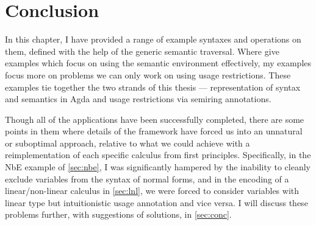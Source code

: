 \section{Conclusion}

In this chapter, I have provided a range of example syntaxes and operations on
them, defined with the help of the generic semantic traversal.
Where \citet{AACMM21} give examples which focus on using the semantic
environment effectively, my examples focus more on problems we can only work on
using usage restrictions.
These examples tie together the two strands of this thesis --- representation of
syntax and semantics in Agda and usage restrictions via semiring annotations.

Though all of the applications have been successfully completed, there are some
points in them where details of the framework have forced us into an unnatural
or suboptimal approach, relative to what we could achieve with a
reimplementation of each specific calculus from first principles.
Specifically, in the NbE example of \cref{sec:nbe}, I was significantly hampered
by the inability to cleanly exclude variables from the syntax of normal forms,
and in the encoding of a linear/non-linear calculus in \cref{sec:lnl}, we were
forced to consider variables with linear type but intuitionistic usage
annotation and vice versa.
I will discuss these problems further, with suggestions of solutions, in
\cref{sec:conc}.
